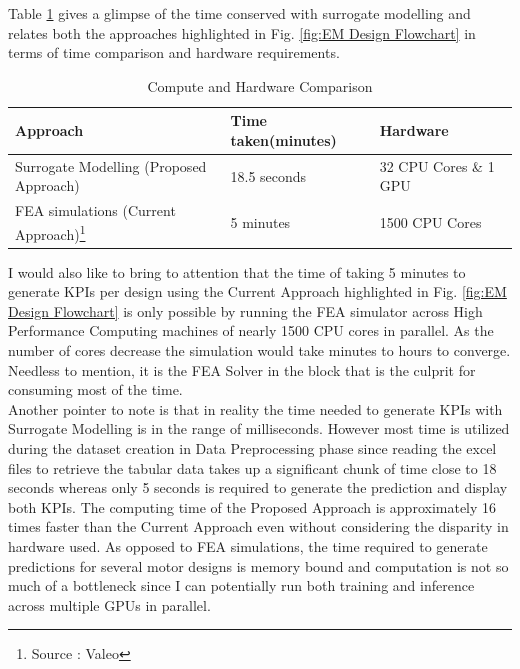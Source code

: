\documentclass{report} %
\begin{document}
Table \ref{tab:Compute Time Comparisions} gives a glimpse of the time conserved with surrogate modelling and relates both the approaches highlighted in Fig. 
\ref{fig:EM Design Flowchart} in terms of time comparison and hardware requirements.

\begin{minipage}[t]{\textwidth}
    \begin{table}[H]
        \centering
        \begin{tabular}{|p{}|p{}|p{}|}
        \hline {\bf Approach} & {\bf Time taken(minutes)} & {\bf Hardware}\\
        \hline 
        Surrogate Modelling (Proposed Approach) & 18.5 seconds & 32 CPU Cores \& 1 GPU\\
        \ac{FEA} simulations (Current Approach)\footnote{Source : Valeo} & 5 minutes & 1500 CPU Cores\\
        \hline
        \end{tabular}
        \caption{Compute and Hardware Comparison}
        \label{tab:Compute Time Comparisions}
    \end{table}
\end{minipage}

\vspace{1em} 

I would also like to bring to attention that the time of taking 5 minutes to generate \ac{KPI}s per design using the Current Approach highlighted in Fig. 
\ref{fig:EM Design Flowchart} is only possible by running the \ac{FEA} simulator across High Performance Computing machines of nearly 1500 CPU cores in parallel. 
As the number of cores decrease the simulation would take minutes to hours to converge. Needless to mention, it is the \ac{FEA} Solver in the block that is the culprit for 
consuming most of the time. \\

Another pointer to note is that in reality the time needed to generate \ac{KPI}s with Surrogate Modelling is in the range of milliseconds. 
However most time is utilized during the dataset creation in Data Preprocessing phase since reading the excel files to retrieve the tabular data takes up a 
significant chunk of time close to 18 seconds whereas only 5 seconds is required to generate the prediction and display both \ac{KPI}s.
The computing time of the Proposed Approach is approximately 16 times faster than the Current Approach even without considering the disparity in hardware used.
As opposed to \ac{FEA} simulations, the time required to generate predictions for several motor designs is memory bound 
and computation is not so much of a bottleneck since I can potentially run both training and inference across multiple GPUs in parallel.\\
\end{document}
